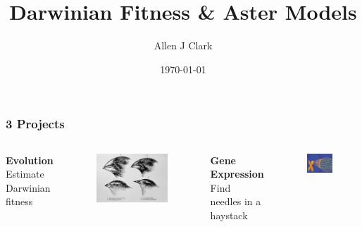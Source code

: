 \documentclass[table]{beamer}
\title[Crop Talk]{Darwinian Fitness \& Aster Models} %
\author{Allen J Clark} %
\institute[UMN] %
{%
M.S. Statistics \\
University of Minnesota \\ %
\medskip
}
\date{\today} %
\begin{document}
\begin{frame}
\titlepage %
\end{frame}

\begin{frame}
\frametitle{3 Projects} %
\begin{columns}[t] %

  \textbf{Evolution}\\
  Estimate Darwinian fitness
\begin{figure}
\includegraphics[width=0.8\linewidth]{finches.jpg}
\end{figure}

  \textbf{Gene Expression}\\
  Find needles in a haystack
\begin{figure}
\includegraphics[width=0.8\linewidth]{DNA.jpg}
\end{figure}


\end{columns}
\end{frame}
\end{document}
